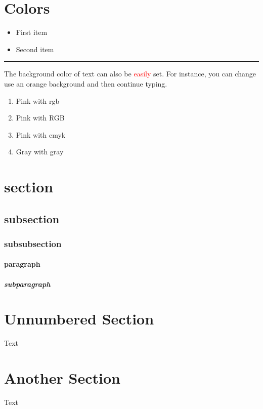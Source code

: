 \documentclass[12pt, a4paper]{article} %
\begin{document}
    \section{Colors}
        \begin{itemize}
            \color{ForestGreen}
            \item First item
            \item Second item
        \end{itemize}

        \noindent
        {\color{RubineRed} \rule{\linewidth}{0.5mm}}

        The background color of text can also be \textcolor{red}{easily} set. For
        instance, you can change use an \colorbox{BurntOrange}{orange background} and then continue typing.

        \begin{enumerate}
            \item \textcolor{mypink1}{Pink with rgb}
            \item \textcolor{mypink2}{Pink with RGB}
            \item \textcolor{mypink3}{Pink with cmyk}
            \item \textcolor{mygray}{Gray with gray}
        \end{enumerate}

    \section{section}
        \subsection{subsection}
            \subsubsection{subsubsection}
                \paragraph{paragraph}
                    \subparagraph{subparagraph}

    \section*{Unnumbered Section}
        Text

    \section{Another Section}
        Text

    
    
\end{document}
